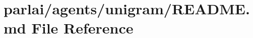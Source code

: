 \hypertarget{parlai_2agents_2unigram_2README_8md}{}\section{parlai/agents/unigram/\+R\+E\+A\+D\+ME.md File Reference}
\label{parlai_2agents_2unigram_2README_8md}
